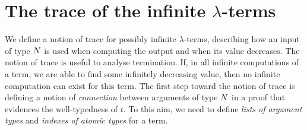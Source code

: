 \section{The trace of the infinite $\lambda$-terms}\label{section-trace-infinite-lambda-terms}

We define a notion of trace for possibly infinite $\lambda$-terms, 
describing how an input of type ${N}$ is used when computing the output
and when its value decreases. The notion of trace is useful to analyse termination.
If, in all infinite computations of a term, we are able to find some infinitely
decreasing value, then no infinite computation can exist for this term. 
The first step toward the notion of trace is defining a notion of \emph{connection} 
between arguments of type ${N}$ in a proof that evidences the well-typedness of $t$. 
To this aim, we need to define \emph{lists of argument types} and \emph{indexes of atomic types} for a term.

%
%

